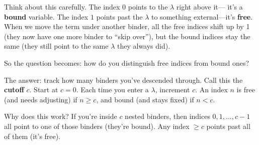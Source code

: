 \documentclass[11pt,a4paper]{article}
\theoremstyle{definition}
\newcommand{\lam}{\lambda}
\begin{document}
Think about this carefully. The index $0$ points to the $\lam$ right above it---
it's a \textbf{bound} variable. The index $1$ points past the $\lam$ to
something external---it's \textbf{free}. When we move the term under another
binder, all the free indices shift up by 1 (they now have one more binder to
``skip over''), but the bound indices stay the same (they still point to the
same $\lam$ they always did).

So the question becomes: how do you distinguish free indices from bound ones?

The answer: track how many binders you've descended through. Call this the
\textbf{cutoff} $c$. Start at $c = 0$. Each time you enter a $\lam$, increment
$c$. An index $n$ is free (and needs adjusting) if $n \geq c$, and bound (and
stays fixed) if $n < c$.

Why does this work? If you're inside $c$ nested binders, then indices
$0, 1, \ldots, c{-}1$ all point to one of those binders (they're bound). Any
index $\geq c$ points past all of them (it's free).
\end{document}
